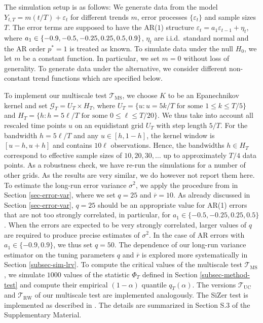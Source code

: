 The simulation setup is as follows: We generate data from the model $Y_{t,T} = m(t/T) + \varepsilon_t$ for different trends $m$, error processes $\{\varepsilon_t\}$ and sample sizes $T$. The error terms are supposed to have the AR($1$) structure $\varepsilon_t = a_1 \varepsilon_{t-1} + \eta_t$, where $a_1 \in \{-0.9,-0.5,-0.25, \linebreak 0.25,0.5,0.9\}$, $\eta_t$ are i.i.d.\ standard normal and the AR order $p^*=1$ is treated as known. To simulate data under the null $H_0$, we let $m$ be a constant function. In particular, we set $m = 0$ without loss of generality. To generate data under the alternative, we consider different non-constant trend functions which are specified below. 


To implement our multiscale test $\mathcal{T}_{\text{MS}}$, we choose $K$ to be an Epanechnikov kernel and set $\mathcal{G}_T = U_T \times H_T$, where $U_T  = \{ u: u = 5k/T \text{ for some } 1 \le k \le T/5 \}$ and $H_T  = \{ h: h = 5\ell/T \text{ for some } 0 \le \ell \le T/20 \}$. We thus take into account all rescaled time points $u$ on an equidistant grid $U_T$ with step length $5/T$. For the bandwidth $h = 5\ell/T$ and any $u \in [h,1-h]$, the kernel window is $[u-h,u+h]$ and contains $10\ell$ observations. Hence, the bandwidths $h \in H_T$ correspond to effective sample sizes of $10,20,30,\ldots$ up to approximately $T/4$ data points. As a robustness check, we have re-run the simulations for a number of other grids. As the results are very similar, we do however not report them here. 
To estimate the long-run error variance $\sigma^2$, we apply the procedure from in Section \ref{sec-error-var}, where we set $q=25$ and $\overline{r}=10$. As already discussed in Section \ref{sec-error-var}, $q=25$ should be an appropriate value for AR(1) errors that are not too strongly correlated, in particular, for $a_1 \in \{-0.5,-0.25,0.25,0.5\}$. When the errors are expected to be very strongly correlated, larger values of $q$ are required to produce precise estimates of $\sigma^2$. In the case of AR errors with $a_1 \in \{-0.9,0.9\}$, we thus set $q = 50$. The dependence of our long-run variance estimator on the tuning parameters $q$ and $\overline{r}$ is explored more systematically in Section \ref{subsec-sim-lrv}. 
To compute the critical values of the multiscale test $\mathcal{T}_{\text{MS}}$, we simulate $1000$ values of the statistic $\Phi_T$ defined in Section \ref{subsec-method-test} and compute their empirical $(1-\alpha)$ quantile $q_T(\alpha)$. The versions $\mathcal{T}_{\text{UC}}$ and $\mathcal{T}_{\text{RW}}$ of our multiscale test are implemented analogously. The SiZer test is implemented as described in \cite{ParkHannigKang2009}. The details are summarized in Section S.3 of the Supplementary Material. 
